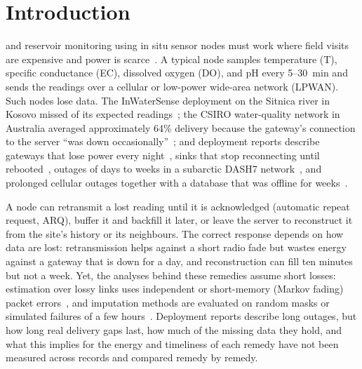 \section{Introduction}
\label{sec:intro}

 and reservoir monitoring using in situ sensor nodes must work where field visits are expensive and power is scarce~\cite{adumanu2017survey,adumanu2020smart}. A typical node samples temperature (T), specific conductance (EC), dissolved oxygen (DO), and pH every 5--30~min and sends the readings over a cellular or low-power wide-area network (LPWAN). Such nodes lose data. The InWaterSense deployment on the Sitnica river in Kosovo missed \inwsLoss{} of its expected readings~\cite{ahmedi2022dataset}; the CSIRO water-quality network in Australia averaged approximately 64\% delivery because the gateway's connection to the server ``was down occasionally''~\cite{ledinh2007design}; and deployment reports describe gateways that lose power every night~\cite{langendoen2006murphy}, sinks that stop reconnecting until rebooted~\cite{ingelrest2010sensorscope,brzozowski2018lessons}, outages of days to weeks in a subarctic DASH7 network~\cite{puluckul2025subarctic}, and prolonged cellular outages together with a database that was offline for weeks~\cite{zennaro2025kyrgyzstan}.

A node can retransmit a lost reading until it is acknowledged (automatic repeat request, ARQ), buffer it and backfill it later, or leave the server to reconstruct it from the site's history or its neighbours. The correct response depends on how data are lost: retransmission helps against a short radio fade but wastes energy against a gateway that is down for a day, and reconstruction can fill ten minutes but not a week. Yet, the analyses behind these remedies assume short losses: estimation over lossy links uses independent or short-memory (Markov fading) packet errors~\cite{sinopoli2004kalman,huang2019retransmit,huang2020harq}, and imputation methods are evaluated on random masks or simulated failures of a few hours~\cite{kong2014dataloss,cini2022grin,marisca2022spin,chang2023deepcs}. Deployment reports describe long outages, but how long real delivery gaps last, how much of the missing data they hold, and what this implies for the energy and timeliness of each remedy have not been measured across records and compared remedy by remedy.

